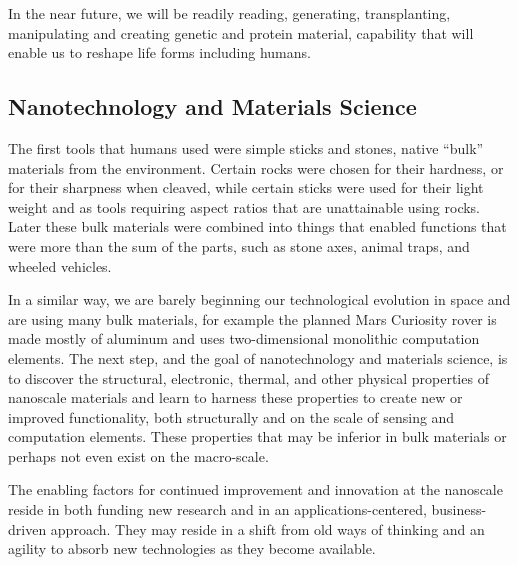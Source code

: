 \documentclass[letter,11pt]{article}
\begin{document}
In the near future, we will be readily reading, generating, transplanting,
manipulating and creating genetic and protein material, capability that will
enable us to reshape life forms including humans.
 

\subsection{Nanotechnology and Materials Science}

The first tools that humans used were simple sticks and stones, native ``bulk''
materials from the environment. Certain rocks were chosen for their hardness,
or for their sharpness when cleaved, while certain sticks were used for their
light weight and as tools requiring aspect ratios that are unattainable using
rocks. Later these bulk materials were combined into things that enabled
functions that were more than the sum of the parts, such as stone axes, animal
traps, and wheeled vehicles.

In a similar way, we are barely beginning our technological evolution in space
and are using many bulk materials, for example the planned Mars Curiosity rover
is made mostly of aluminum and uses two-dimensional monolithic computation
elements. The next step, and the goal of nanotechnology and materials science,
is to discover the structural, electronic, thermal, and other physical
properties of nanoscale materials and learn to harness these properties to
create new or improved functionality, both structurally and on the scale of
sensing and computation elements. These properties that may be inferior in bulk
materials or perhaps not even exist on the macro-scale.

The enabling factors for continued improvement and innovation at the nanoscale
reside in both funding new research and in an applications-centered,
business-driven approach. They may reside in a shift from old ways of thinking
and an agility to absorb new technologies as they become available.
\end{document}
